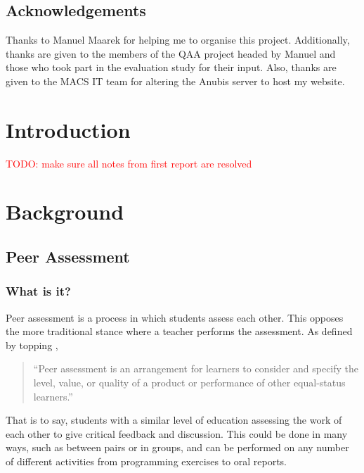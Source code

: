 \documentclass[a4paper,11pt]{report}
\newcommand{\todo}[1]{\textcolor{red}{TODO: #1}}
\begin{document}
\newpage

\section*{Acknowledgements}
Thanks to Manuel Maarek for helping me to organise this project. Additionally, thanks are given to the members of the QAA project headed by Manuel and those who took part in the evaluation study for their input. Also, thanks are given to the MACS IT team for altering the Anubis server to host my website.

\newpage

\pagestyle{headings}



\chapter{Introduction}
\todo{make sure all notes from first report are resolved}


\chapter{Background}
\section{Peer Assessment}
\subsection{What is it?}
Peer assessment is a process in which students assess each other. This opposes the more traditional stance where a teacher performs the assessment. As defined by topping \cite{topping_peer_2009},
\begin{quote}
``Peer assessment is an arrangement for learners to consider and specify the level, value, or quality of a product or performance of other equal-status learners.''
\end{quote}
That is to say, students with a similar level of education assessing the work of each other to give critical feedback and discussion. This could be done in many ways, such as between pairs or in groups, and can be performed on any number of different activities from programming exercises to oral reports.\par
\end{document}
